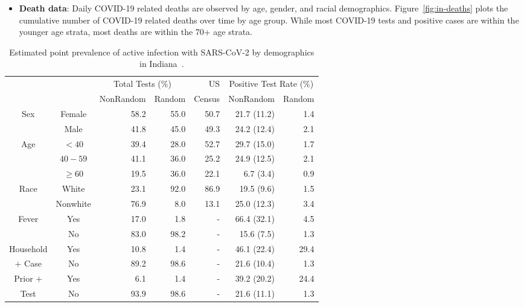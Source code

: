\documentclass[11pt]{amsart}
\numberwithin{equation}{section}
\theoremstyle{plain}
\begin{document}
\begin{itemize}[leftmargin=*]
\item {\bf Death data}: Daily COVID-19 related deaths are observed by age, gender, and racial demographics.  Figure~\ref{fig:in-deaths} plots the cumulative number of COVID-19 related deaths over time by age group. While most COVID-19 tests and positive cases are within the younger age strata, most deaths are within the 70+ age strata.
\end{itemize}


\begin{table}[th]
\begin{tabular}{c | c | r r | r | r r }
& & \multicolumn{2}{c}{Total Tests (\%)} & US & \multicolumn{2}{c}{Positive Test Rate (\%)}\\
\cline{3-4} \cline{6-7}
& & NonRandom & Random & Census & NonRandom & Random \\ \hline
\multirow{2}{*}{Sex} & Female & 58.2 & 55.0 & 50.7 & 21.7 (11.2) & 1.4 \\
& Male & 41.8 & 45.0 & 49.3 & 24.2 (12.4) & 2.1 \\ \hline
\multirow{3}{*}{Age} & $<40$ & 39.4 & 28.0 & 52.7 & 29.7 (15.0) & 1.7 \\
& $40-59$ & 41.1 & 36.0 & 25.2 & 24.9 (12.5) & 2.1 \\
& $\geq 60$ & 19.5 & 36.0 & 22.1 & 6.7 (3.4) & 0.9 \\ \hline
\multirow{2}{*}{Race} & White & 23.1 & 92.0 & 86.9 & 19.5 (9.6) & 1.5 \\
& Nonwhite & 76.9 & 8.0 & 13.1 & 25.0 (12.3) & 3.4 \\ \hline
\multirow{2}{*}{Fever} & Yes & 17.0 & 1.8 & - & 66.4 (32.1) & 4.5 \\
& No & 83.0 & 98.2 & - & 15.6 (7.5) & 1.3 \\ \hline
Household & Yes & 10.8 & 1.4 & - & 46.1 (22.4) & 29.4 \\
$+$ Case & No & 89.2 & 98.6 & - & 21.6 (10.4) & 1.3 \\ \hline
Prior $+$ & Yes & 6.1 & 1.4 & - & 39.2 (20.2) & 24.4 \\
Test & No & 93.9 & 98.6 & - & 21.6 (11.1) & 1.3 \\ \hline
\end{tabular}
\caption{Estimated point prevalence of active infection with SARS-CoV-2 by demographics in Indiana~\cite{Yiannoutsos2021}.}
\label{tab:indiana}
\end{table}
\end{document}
